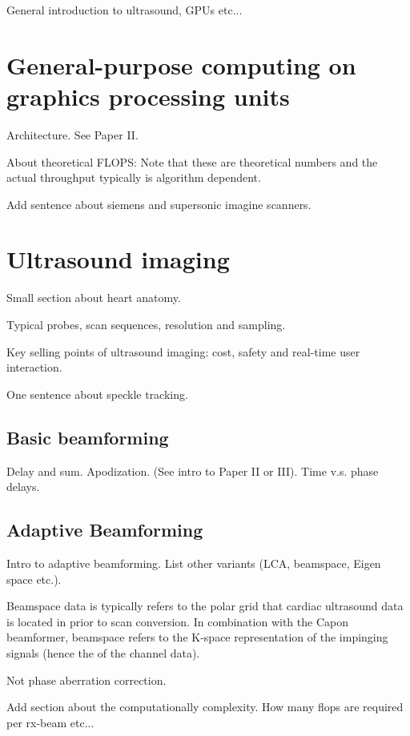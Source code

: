 %

General introduction to ultrasound, GPUs etc...

\section{General-purpose computing on graphics processing units}

Architecture. See Paper II.

About theoretical FLOPS: Note that these are theoretical numbers and the actual throughput typically is algorithm dependent.

Add sentence about siemens and supersonic imagine scanners.

\section {Ultrasound imaging}

Small section about heart anatomy.

Typical probes, scan sequences, resolution and sampling.

Key selling points of ultrasound imaging: cost, safety and real-time user interaction.

One sentence about speckle tracking.
							
\subsection{Basic beamforming}

Delay and sum. Apodization. (See intro to Paper II or III).
Time v.s. phase delays.

\subsection{Adaptive Beamforming}\label{sec:adaptbf}

Intro to adaptive beamforming. List other variants (LCA, beamspace, Eigen space etc.). 

Beamspace data is typically refers to the polar grid that cardiac ultrasound data is located in prior to scan conversion. In combination with the Capon beamformer, beamspace refers to the K-space representation of the impinging signals (hence the  of the channel data). 

Not phase aberration correction.

Add section about the computationally complexity. How many flops are required per rx-beam etc...

